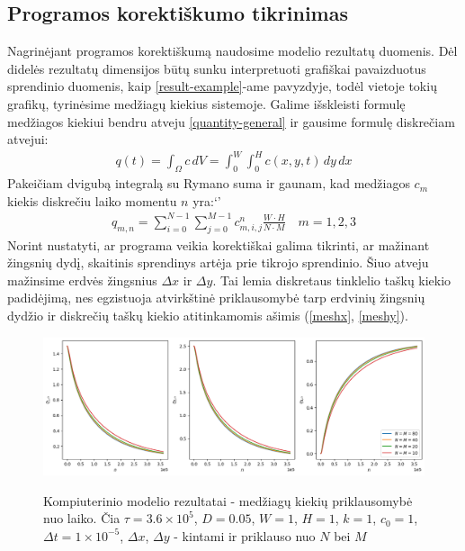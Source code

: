 \newpage
\subsection{Programos korektiškumo tikrinimas}


Nagrinėjant programos korektiškumą naudosime modelio rezultatų duomenis. Dėl didelės rezultatų dimensijos būtų sunku interpretuoti grafiškai pavaizduotus sprendinio duomenis, kaip \hbox{\ref{result-example}-ame} pavyzdyje, todėl vietoje tokių grafikų, tyrinėsime medžiagų kiekius sistemoje. Galime išskleisti formulę medžiagos kiekiui bendru atveju \eqref{quantity-general} ir gausime formulę diskrečiam atvejui:
\begin{align}
    q(t) = \int_\Omega c\,dV = \int_0^W \int_0^H c(x, y, t)\,dy\,dx
\end{align}
Pakeičiam dvigubą integralą su Rymano suma ir gaunam, kad medžiagos $c_m$ kiekis diskrečiu laiko momentu $n$ yra:`'
\begin{align}
    q_{m, n}= \sum_{i=0}^{N-1}\sum_{j=0}^{M-1} c_{m, i,j}^n \frac{W\cdot H}{N\cdot M} \quad m=1, 2, 3
\end{align}
Norint nustatyti, ar programa veikia korektiškai galima tikrinti, ar mažinant žingsnių dydį, skaitinis sprendinys artėja prie tikrojo sprendinio. Šiuo atveju mažinsime erdvės žingsnius $\Delta x$ ir $\Delta y$. Tai lemia diskretaus tinklelio taškų kiekio padidėjimą, nes egzistuoja atvirkštinė priklausomybė tarp erdvinių žingsnių dydžio ir diskrečių taškų kiekio atitinkamomis ašimis (\ref{meshx}, \ref{meshy}).
\begin{figure}[h!]
    \centering
    \includegraphics[width=\textwidth]{../assets/space-error-v2.png} \\
    \caption{Kompiuterinio modelio rezultatai - medžiagų kiekių priklausomybė nuo laiko. Čia $\tau=3.6\times 10^5$, $D=0.05$, $W = 1$, $H=1$, $k = 1$, $c_0 = 1$, $\Delta t = 1\times 10^{-5}$, $\Delta x$, $\Delta y$ - kintami ir priklauso nuo $N$ bei $M$ }
\end{figure}

